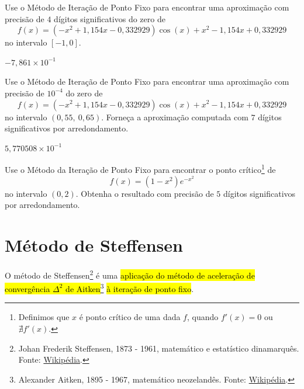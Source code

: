 \begin{exer}
  Use o Método de Iteração de Ponto Fixo para encontrar uma aproximação com precisão de $4$ dígitos significativos do zero de 
  \begin{equation}
    f(x) = (-x^2+1,154x-0,332929)\cos(x) + x^2 - 1,154x + 0,332929
  \end{equation}
  no intervalo $[-1, 0]$.
\end{exer}
\begin{resp}
  $-7,861\times 10^{-1}$
\end{resp}

\begin{exer}
  Use o Método de Iteração de Ponto Fixo para encontrar uma aproximação com precisão de $10^{-4}$ do zero de
  \begin{equation}
    f(x) = (-x^2+1,154x-0,332929)\cos(x) + x^2 - 1,154x + 0,332929
  \end{equation}
no intervalo $(0,55, ~0,65)$. Forneça a aproximação computada com $7$ dígitos significativos por arredondamento.
\end{exer}
\begin{resp}
  $5,770508\times 10^{-1}$
\end{resp}

\begin{exer}
  Use o Método da Iteração de Ponto Fixo para encontrar o ponto crítico\footnote{Definimos que $x$ é ponto crítico de uma dada $f$, quando $f'(x) = 0$ ou $\nexists f'(x)$.} de
  \begin{equation}
    f(x) = (1-x^2)e^{-x^2}
  \end{equation}
  no intervalo $(0, 2)$. Obtenha o resultado com precisão de $5$ dígitos significativos por arredondamento.
\end{exer}

\section{Método de Steffensen}\label{cap_eq1d_sec_Steffensen}

O método de Steffensen\footnote{Johan Frederik Steffensen, 1873 - 1961, matemático e estatístico dinamarquês. Fonte: \href{https://pt.wikipedia.org/wiki/Johan_Frederik_Steffensen}{Wikipédia}.} é uma \hl{aplicação do método de aceleração de convergência $\Delta^2$ de Aitken}\footnote{Alexander Aitken, 1895 - 1967, matemático neozelandês. Fonte: \href{https://pt.wikipedia.org/wiki/Alexander_Aitken}{Wikipédia}.} \hl{à iteração de ponto fixo}.

